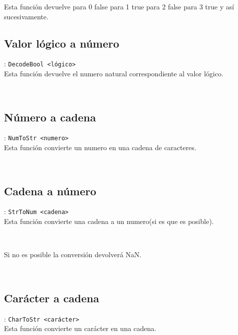       Esta función devuelve para 0 false para 1 true para 2 false para 3 true y así sucesivamente.
      
      \subsection*{Valor lógico a número}: \texttt{DecodeBool <lógico>}\\
      Esta función devuelve el numero natural correspondiente al valor lógico.
      
      \begin{fxcode}
         \\
      \end{fxcode}
      
      \subsection*{Número a cadena}: \texttt{NumToStr <numero>}\\
      Esta función convierte un numero en una cadena de caracteres.
      
      \begin{fxcode}
         \\
      \end{fxcode}
      
      \subsection*{Cadena a número}: \texttt{StrToNum <cadena>}\\
      Esta función convierte una cadena a un numero(si es que es posible).
      
      \begin{fxcode}
         \\
      \end{fxcode}
   
      Si no es posible la conversión devolverá NaN.
      
      \begin{fxcode}
         \\
      \end{fxcode}
      
      \subsection*{Carácter a cadena}: \texttt{CharToStr <carácter>}\\
      Esta función convierte un carácter en una cadena.
      
